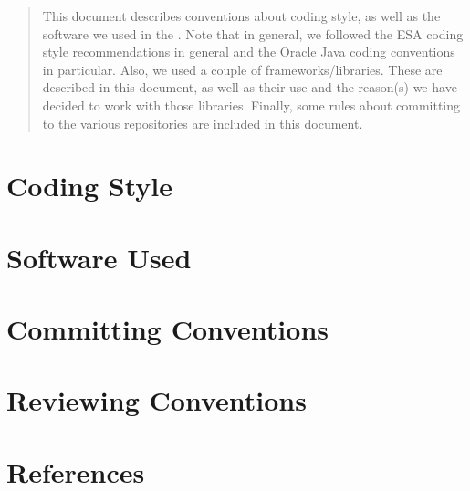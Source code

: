 
\renewcommand{\pathtobase}[1]{../#1}

\renewcommand{\TitelFull}{Conventions about Coding Style and Software}
\renewcommand{\TitelAbbr}{CaCSaS}
\renewcommand{\Version}{0.3}



\fingerpainttitlepage{}

\begin{abstract}
This document describes conventions about coding style, as well as the software we used in the \applicationname. Note that in general, we followed the ESA coding style recommendations \cite{esa-coding-style} in general and the Oracle Java coding conventions \cite{oracle-java-coding-style} in particular. Also, we used a couple of frameworks/libraries. These are described in this document, as well as their use and the reason(s) we have decided to work with those libraries. Finally, some rules about committing to the various repositories are included in this document.
\end{abstract}

\tableofcontents



\chapter{Coding Style}
\label{chap:coding-style}


\chapter{Software Used}
\label{chap:software-used}


\chapter{Committing Conventions}
\label{chap:commit-conventions}


\chapter{Reviewing Conventions}
\label{chap:review-conventions}


\chapter{References}



